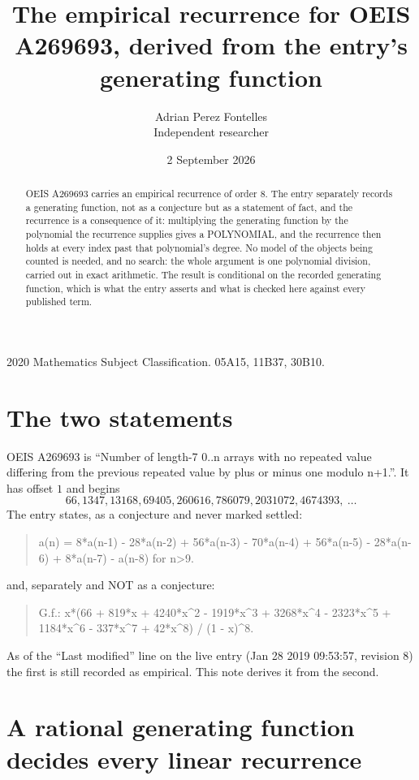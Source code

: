 \documentclass[11pt,a4paper]{article}
\title{The empirical recurrence for OEIS A269693, derived from the entry's generating function}
\author{Adrian Perez Fontelles\\ \small Independent researcher}
\date{2 September 2026}
\theoremstyle{plain}
\theoremstyle{definition}
\begin{document}
\maketitle

\begin{abstract}
OEIS A269693 carries an empirical recurrence of order $8$. The entry separately records a
generating function, not as a conjecture but as a statement of fact, and the recurrence is a
consequence of it: multiplying the generating function by the polynomial the recurrence
supplies gives a POLYNOMIAL, and the recurrence then holds at every index past that
polynomial's degree. No model of the objects being counted is needed, and no search: the
whole argument is one polynomial division, carried out in exact arithmetic. The result is
conditional on the recorded generating function, which is what the entry asserts and what is
checked here against every published term.
\end{abstract}

\noindent\small 2020 Mathematics Subject Classification. 05A15, 11B37, 30B10.\normalsize

\section{The two statements}

OEIS A269693 is ``Number of length-7 0..n arrays with no repeated value differing from the previous repeated value by plus or minus one modulo n+1.''. It has offset $1$ and begins
\[
66, 1347, 13168, 69405, 260616, 786079, 2031072, 4674393,\ \dots
\]
The entry states, as a conjecture and never marked settled:
\begin{quote}
a(n) = 8*a(n-1) - 28*a(n-2) + 56*a(n-3) - 70*a(n-4) + 56*a(n-5) - 28*a(n-6) + 8*a(n-7) - a(n-8) for n>9.
\end{quote}
and, separately and NOT as a conjecture:
\begin{quote}
G.f.: x*(66 + 819*x + 4240*x\^{}2 - 1919*x\^{}3 + 3268*x\^{}4 - 2323*x\^{}5 + 1184*x\^{}6 - 337*x\^{}7 + 42*x\^{}8) / (1 - x)\^{}8.
\end{quote}
As of the ``Last modified'' line on the live entry (Jan 28 2019 09:53:57, revision 8) the first is still
recorded as empirical. This note derives it from the second.

\section{A rational generating function decides every linear recurrence}
\end{document}
